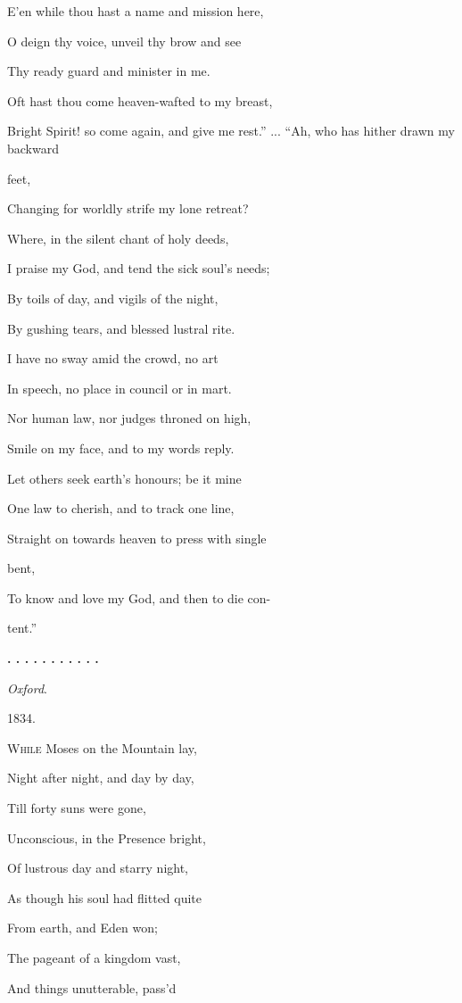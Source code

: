 E'en while thou hast a name and mission here,

O deign thy voice, unveil thy brow and see

Thy ready guard and minister in me.

Oft hast thou come heaven-wafted to my breast,

Bright Spirit! so come again, and give me rest.'' ... ``Ah, who has hither drawn my backward

feet,

Changing for worldly strife my lone retreat?

Where, in the silent chant of holy deeds,

I praise my God, and tend the sick soul's needs;

By toils of day, and vigils of the night,

By gushing tears, and blessed lustral rite.

I have no sway amid the crowd, no art

In speech, no place in council or in mart.

Nor human law, nor judges throned on high,

Smile on my face, and to my words reply.

Let others seek earth's honours; be it mine

One law to cherish, and to track one line,

Straight on towards heaven to press with single

bent,

To know and love my God, and then to die con-

tent.''

\textbf{. . .
. . . . . . . .}

\emph{Oxford}.

1834.


W\textsc{hile} Moses on the Mountain lay,

Night after night, and day by day,

Till forty suns were
gone,

Unconscious, in the Presence bright,

Of lustrous day and starry night,

As though his soul had flitted quite

From earth, and Eden won;

The pageant of a kingdom vast,

And things unutterable, pass'd

